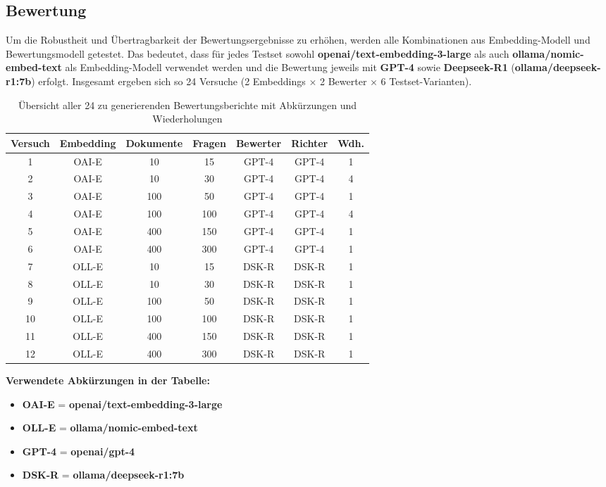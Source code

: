 \subsection{Bewertung}
\label{sec:bewertung}
Um die Robustheit und Übertragbarkeit der Bewertungsergebnisse zu erhöhen, werden alle Kombinationen aus Embedding-Modell und Bewertungsmodell getestet. Das bedeutet, dass für jedes Testset sowohl \textbf{openai/text-embedding-3-large} als auch \textbf{ollama/nomic-embed-text} als Embedding-Modell verwendet werden und die Bewertung jeweils mit \textbf{GPT-4} sowie \textbf{Deepseek-R1} (\textbf{ollama/deepseek-r1:7b}) erfolgt. Insgesamt ergeben sich so 24 Versuche (2 Embeddings $\times$ 2 Bewerter $\times$ 6 Testset-Varianten).
\begin{table}[htbp]
    \centering
    \begin{tabular}{|c|c|c|c|c|c|c|}
        \hline
        \textbf{Versuch} & \textbf{Embedding} & \textbf{Dokumente} & \textbf{Fragen} & \textbf{Bewerter} & \textbf{Richter} & \textbf{Wdh.} \\
        \hline
        1  & OAI-E & 10   & 15  & GPT-4 & GPT-4 & 1 \\
        2  & OAI-E & 10   & 30  & GPT-4 & GPT-4 & 4 \\
        3  & OAI-E & 100  & 50  & GPT-4 & GPT-4 & 1 \\
        4  & OAI-E & 100  & 100 & GPT-4 & GPT-4 & 4 \\
        5  & OAI-E & 400 & 150 & GPT-4 & GPT-4 & 1 \\
        6  & OAI-E & 400 & 300 & GPT-4 & GPT-4 & 1 \\
        \hline
        7  & OLL-E & 10   & 15  & DSK-R & DSK-R & 1 \\
        8  & OLL-E & 10   & 30  & DSK-R & DSK-R & 1 \\
        9  & OLL-E & 100  & 50  & DSK-R & DSK-R & 1 \\
        10 & OLL-E & 100  & 100 & DSK-R & DSK-R & 1 \\
        11 & OLL-E & 400 & 150 & DSK-R & DSK-R & 1 \\
        12 & OLL-E & 400 & 300 & DSK-R & DSK-R & 1 \\
        \hline
    \end{tabular}
    \caption{Übersicht aller 24 zu generierenden Bewertungsberichte mit Abkürzungen und Wiederholungen}
    \label{tab:bewertungsberichte}
\end{table}

\noindent
\textbf{Verwendete Abkürzungen in der Tabelle:}
\begin{itemize}
    \item \textbf{OAI-E} = \textbf{openai/text-embedding-3-large}
    \item \textbf{OLL-E} = \textbf{ollama/nomic-embed-text}
    \item \textbf{GPT-4} = \textbf{openai/gpt-4}
    \item \textbf{DSK-R} = \textbf{ollama/deepseek-r1:7b}
\end{itemize}